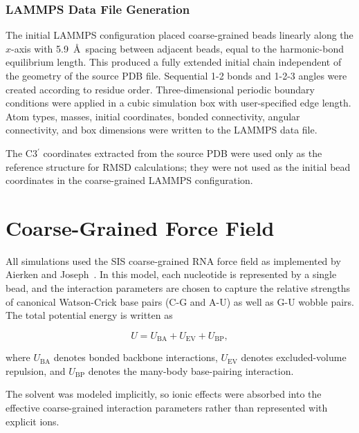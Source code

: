 
\subsubsection{LAMMPS Data File Generation}

The initial LAMMPS configuration placed coarse-grained beads linearly along
the $x$-axis with 5.9~\AA\ spacing between adjacent beads, equal to the
harmonic-bond equilibrium length. This produced a fully extended initial chain
independent of the geometry of the source PDB file. Sequential 1-2 bonds and
1-2-3 angles were created according to residue order. Three-dimensional
periodic boundary conditions were applied in a cubic simulation box with
user-specified edge length. Atom types, masses, initial coordinates, bonded
connectivity, angular connectivity, and box dimensions were written to the
LAMMPS data file.

The C3$^\prime$ coordinates extracted from the source PDB were used only as the
reference structure for RMSD calculations; they were not used as the initial
bead coordinates in the coarse-grained LAMMPS configuration.


\section{Coarse-Grained Force Field}
\label{sec:forcefield}

All simulations used the SIS coarse-grained RNA force field as implemented by
Aierken and Joseph~\cite{Aierken2024}. In this model, each nucleotide is
represented by a single bead, and the interaction parameters are chosen to
capture the relative strengths of canonical Watson-Crick base pairs (C-G and
A-U) as well as G-U wobble pairs. The total potential energy is written as

\begin{equation}
  U = U_{\mathrm{BA}} + U_{\mathrm{EV}} + U_{\mathrm{BP}},
  \label{eq:Utot}
\end{equation}

where $U_{\mathrm{BA}}$ denotes bonded backbone interactions,
$U_{\mathrm{EV}}$ denotes excluded-volume repulsion, and
$U_{\mathrm{BP}}$ denotes the many-body base-pairing interaction.

The solvent was modeled implicitly, so ionic effects were absorbed into the
effective coarse-grained interaction parameters rather than represented with
explicit ions.


